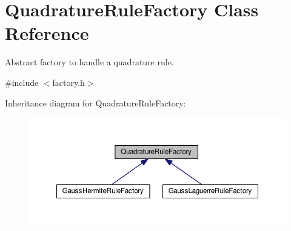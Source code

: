 \hypertarget{classQuadratureRuleFactory}{\section{Quadrature\-Rule\-Factory Class Reference}
\label{classQuadratureRuleFactory}
}


Abstract factory to handle a quadrature rule.  




{\ttfamily \#include $<$factory.\-h$>$}



Inheritance diagram for Quadrature\-Rule\-Factory\-:\nopagebreak
\begin{figure}[H]
\begin{center}
\leavevmode
\includegraphics[width=350pt]{classQuadratureRuleFactory__inherit__graph}
\end{center}
\end{figure}
